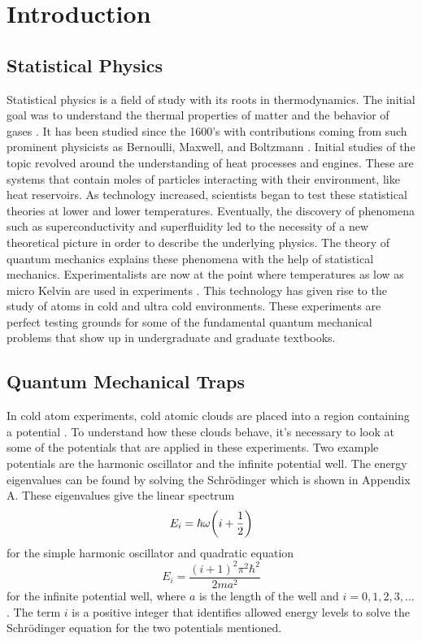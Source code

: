 \chapter{Introduction} \label{ch:introduction}
\section{Statistical Physics}
Statistical physics is a field of study with its roots in thermodynamics. The initial goal was to understand the thermal properties of matter and the behavior of gases \cite{Kardar}. It has been studied since the 1600's with contributions coming from such prominent physicists as Bernoulli, Maxwell, and Boltzmann \cite{Flamm1998}. Initial studies of the topic  revolved around the understanding of heat processes and engines. These are systems that contain moles of particles interacting with their environment, like heat reservoirs. As technology increased, scientists began to test these statistical theories at lower and lower temperatures. Eventually, the discovery of phenomena such as superconductivity and superfluidity led to the necessity of a new theoretical picture in order to describe the underlying physics. The theory of quantum mechanics explains these phenomena with the help of statistical mechanics. Experimentalists are now at the point where temperatures as low as micro Kelvin are used in experiments \cite{Onofrio2016, Es2010,Bhar}. This technology has given rise to the study of atoms in cold and ultra cold environments. These experiments are perfect testing grounds for some of the fundamental quantum mechanical problems that show up in undergraduate and graduate textbooks. 

\section{Quantum Mechanical Traps}
In cold atom experiments, cold atomic clouds are placed into a region containing a potential \cite{Bhar}. To understand how these clouds behave, it's necessary to look at some of the potentials that are applied in these experiments. Two example potentials are the harmonic oscillator and the infinite potential well. The energy eigenvalues can be found by solving the Schr\"odinger which is shown in Appendix A. These eigenvalues give the linear spectrum 
\begin{equation}
    E_i=\hbar\omega\qty(i+\frac{1}{2}) \label{SHOpot}
\end{equation}
for the simple harmonic oscillator and quadratic equation 
\begin{equation}
    E_i=\frac{(i+1)^2\pi^2\hbar^2}{2ma^2} \label{quadpot}
\end{equation}
for the infinite potential well, where $a$ is the length of the well and $i=0,1,2,3,...$. The term $i$ is a positive integer that identifies allowed energy levels to solve the Schr\"odinger equation for the two potentials mentioned.

